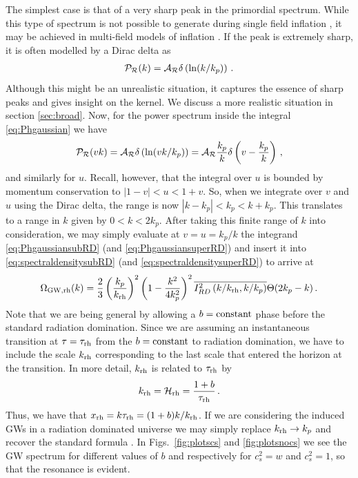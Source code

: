 \documentclass[a4paper,11pt]{article}
\numberwithin{equation}{section}
\begin{document}
The simplest case is that of a very sharp peak in the primordial spectrum. While this type of spectrum is not possible to generate during single field inflation \cite{Byrnes:2018txb,Carrilho:2019oqg,Ozsoy:2019lyy}, it may be achieved in multi-field models of inflation \cite{Kawasaki:1997ju,Frampton:2010sw,Kawasaki:2012wr,Inomata:2017okj,Pi:2017gih,Cai:2018tuh,Cai:2019jah,Chen:2019zza,Chen:2020uhe}. If the peak is extremely sharp, it is often modelled by a Dirac delta as
\begin{align}
{\cal P}_{\cal R}(k)={\cal A}_{\cal R}\delta\left(\ln(k/k_p)\right)\,.
\end{align}
Although this might be an unrealistic situation, it captures the essence of sharp peaks and gives insight on the kernel. We discuss a more realistic situation in section \ref{sec:broad}. Now, for the power spectrum inside the integral \eqref{eq:Phgaussian} we have
\begin{align}
{\cal P}_{\cal R}(vk)={\cal A}_{\cal R}\delta\left(\ln(vk/k_p)\right)={\cal A}_{\cal R}\frac{k_p}{k}\delta\left(v-\frac{k_p}{k}\right)\,,
\end{align}
and similarly for $u$. Recall, however, that the integral over $u$ is bounded by momentum conservation to $|1-v|<u<1+v$. So, when we integrate over $v$ and $u$ using the Dirac delta, the range is now $|k-k_p|<k_p<k+k_p$. This translates to a range in $k$ given by $0<k<2k_p$. After taking this finite range of $k$ into consideration, we may simply evaluate at $v=u=k_p/k$ the integrand \eqref{eq:PhgaussiansubRD} (and \eqref{eq:PhgaussiansuperRD}) and insert it into \eqref{eq:spectraldensitysubRD} (and \eqref{eq:spectraldensitysuperRD}) to arrive at
\begin{align}\label{eq:omegadelta}
\Omega_{\rm GW,rh}(k)=\frac{2}{3}\left(\frac{k_p}{k_{\rm rh}}\right)^{2}\left(1-\frac{k^2}{4k_p^2}\right)^2\overline{I_{RD}^2\left({k}/{k_{\rm rh}},{k}/{k_p}\right)}\Theta(2k_p-k)\,.
\end{align}
Note that we are being general by allowing a $b={\rm constant}$ phase before the standard radiation domination. Since we are assuming an instantaneous transition at $\tau=\tau_{\rm rh}$ from the $b={\rm constant}$ to radiation domination, we have to include the scale $k_{\rm rh}$ corresponding to the last scale that entered the horizon at the transition. In more detail, $k_{\rm rh}$ is related to $\tau_{\rm rh}$ by
\begin{align}
k_{\rm rh}={\cal H}_{\rm rh}=\frac{1+b}{\tau_{\rm rh}}\,.
\end{align}
Thus, we have that $x_{\rm rh}=k\tau_{\rm rh}=(1+b)k/k_{\rm rh}$. If we are considering the induced GWs in a radiation dominated universe we may simply replace $k_{\rm rh}\to k_p$ and recover the standard formula \cite{Kohri:2018awv}. In Figs.~\ref{fig:plotscs} and \ref{fig:plotsnocs} we see the GW spectrum for different values of $b$ and respectively for $c_s^2=w$ and $c_s^2=1$, so that the resonance is evident.
\end{document}
